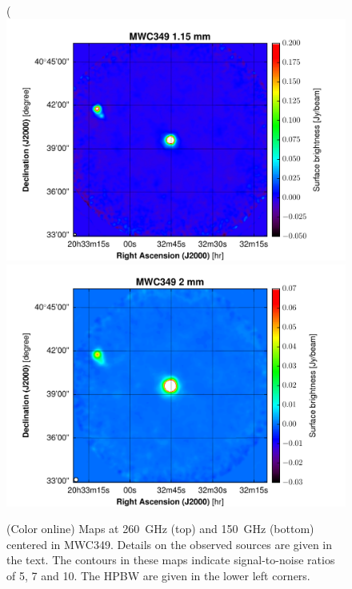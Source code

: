 \documentclass[]{aa} %
\begin{document}
\begin{figure}[h]
   \centering(
   \includegraphics[width=.75\linewidth]{MWC349_1mm_map_snrcont.pdf}
    \includegraphics[width=.75\linewidth]{MWC349_2mm_map_snrcont.pdf} 
      \caption{(Color online) Maps at 260~GHz (top) and 150~GHz (bottom) centered in MWC349. Details on the observed sources are given in the text. The contours in these maps indicate signal-to-noise ratios of 5, 7 and 10. The HPBW are given in the lower left corners.
         \label{fig_compact_sources1}}
\end{figure}
\end{document}
